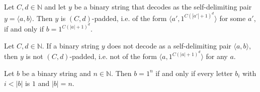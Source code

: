\begin{lemma}
\label{Complexity.epad_valid_iff_of_decode}
\leanok
{}
Let $C, d \in \mathbb{N}$ and let $y$ be a binary string that decodes as the self-delimiting pair
$y = \langle a, b\rangle$. Then $y$ is $(C,d)$-padded, i.e. of the form
$\langle a', 1^{C(|a'|+1)^d}\rangle$ for some $a'$, if and only if $b = 1^{C(|a|+1)^d}$.
\end{lemma}

\begin{lemma}
\label{Complexity.epad_not_valid_of_decode}
\leanok
{}
Let $C, d \in \mathbb{N}$. If a binary string $y$ does not decode as a self-delimiting pair
$\langle a, b\rangle$, then $y$ is not $(C,d)$-padded, i.e. not of the form
$\langle a, 1^{C(|a|+1)^d}\rangle$ for any $a$.
\end{lemma}

\begin{lemma}
\label{Complexity.epad_eq_replicate_iff}
\leanok
{}
Let $b$ be a binary string and $n \in \mathbb{N}$. Then $b = 1^n$ if and only if every letter
$b_i$ with $i < |b|$ is $1$ and $|b| = n$.
\end{lemma}

